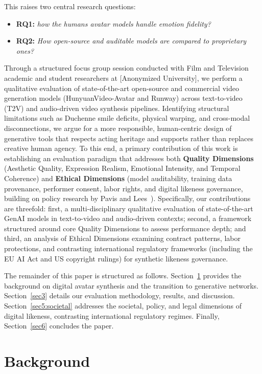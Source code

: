 \documentclass[pdflatex,sn-mathphys-num]{sn-jnl}
\theoremstyle{thmstyleone}
\theoremstyle{thmstyletwo}
\theoremstyle{thmstylethree}
\begin{document}
This raises two central research questions: 
\begin{itemize}
    \item \textbf{RQ1:} \textit{how the humans avatar models handle emotion fidelity?}
    \item \textbf{RQ2:} \textit{How open-source and auditable models are compared to proprietary ones?}
\end{itemize}

Through a structured focus group session conducted with Film and Television academic and student researchers at [Anonymized University], we perform a qualitative evaluation of state-of-the-art open-source and commercial video generation models (HunyuanVideo-Avatar and Runway) across text-to-video (T2V) and audio-driven video synthesis pipelines. Identifying structural limitations such as Duchenne smile deficits, physical warping, and cross-modal disconnections, we argue for a more responsible, human-centric design of generative tools that respects acting heritage and supports rather than replaces creative human agency. To this end, a primary contribution of this work is establishing an evaluation paradigm that addresses both \textbf{Quality Dimensions} (Aesthetic Quality, Expression Realism, Emotional Intensity, and Temporal Coherence) and \textbf{Ethical Dimensions} (model auditability, training data provenance, performer consent, labor rights, and digital likeness governance, building on policy research by Pavis and Lees~\cite{pavis2025ai, signapselinkedin}). Specifically, our contributions are threefold: first, a multi-disciplinary qualitative evaluation of state-of-the-art GenAI models in text-to-video and audio-driven contexts; second, a framework structured around core Quality Dimensions to assess performance depth; and third, an analysis of Ethical Dimensions examining contract patterns, labor protections, and contrasting international regulatory frameworks (including the EU AI Act and US copyright rulings) for synthetic likeness governance.

The remainder of this paper is structured as follows. Section~\ref{sec:mocap_systems} provides the background on digital avatar synthesis and the transition to generative networks. Section~\ref{sec3} details our evaluation methodology, results, and discussion. Section~\ref{sec5:societal} addresses the societal, policy, and legal dimensions of digital likeness, contrasting international regulatory regimes. Finally, Section~\ref{sec6} concludes the paper.


\section{Background}\label{sec:mocap_systems}
\end{document}
